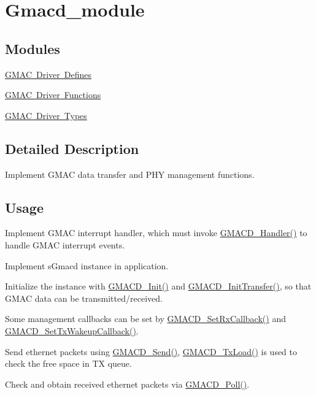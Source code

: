 \hypertarget{group__gmacd__module}{}\section{Gmacd\+\_\+module}
\label{group__gmacd__module}
\subsection*{Modules}
\begin{DoxyCompactItemize}
\item 
\mbox{\hyperlink{group__gmacd__defines}{G\+M\+A\+C Driver Defines}}
\item 
\mbox{\hyperlink{group__gmacd__functions}{G\+M\+A\+C Driver Functions}}
\item 
\mbox{\hyperlink{group__gmacd__types}{G\+M\+A\+C Driver Types}}
\end{DoxyCompactItemize}


\subsection{Detailed Description}
Implement G\+M\+AC data transfer and P\+HY management functions.\hypertarget{group__RTEMSBSPsARM_Usage}{}\subsection{Usage}\label{group__RTEMSBSPsARM_Usage}

\begin{DoxyEnumerate}
\item Implement G\+M\+AC interrupt handler, which must invoke \mbox{\hyperlink{group__gmacd__functions_ga782194c9b7163c22016beabc6101856c}{G\+M\+A\+C\+D\+\_\+\+Handler()}} to handle G\+M\+AC interrupt events.
\item Implement s\+Gmacd instance in application.
\item Initialize the instance with \mbox{\hyperlink{group__gmacd__functions_ga8706caf686e1d073851111db1ba2663c}{G\+M\+A\+C\+D\+\_\+\+Init()}} and \mbox{\hyperlink{group__gmacd__functions_ga418589cbbef19de6084670d572b6ae27}{G\+M\+A\+C\+D\+\_\+\+Init\+Transfer()}}, so that G\+M\+AC data can be transmitted/received.
\item Some management callbacks can be set by \mbox{\hyperlink{group__gmacd__functions_ga3ea0884def476f9698f1cdbae6b6f3e2}{G\+M\+A\+C\+D\+\_\+\+Set\+Rx\+Callback()}} and \mbox{\hyperlink{group__gmacd__functions_ga0806a8a23ffb3180d3404ec6d7fbfa1d}{G\+M\+A\+C\+D\+\_\+\+Set\+Tx\+Wakeup\+Callback()}}.
\item Send ethernet packets using \mbox{\hyperlink{group__gmacd__functions_ga2f3e029556b9627258a2eb1dc4919d95}{G\+M\+A\+C\+D\+\_\+\+Send()}}, \mbox{\hyperlink{group__gmacd__functions_ga1bd3fe40e63537dce59dd4368dce4253}{G\+M\+A\+C\+D\+\_\+\+Tx\+Load()}} is used to check the free space in TX queue.
\item Check and obtain received ethernet packets via \mbox{\hyperlink{group__gmacd__functions_gaa45b1118c5a1147bde4e3026194bc965}{G\+M\+A\+C\+D\+\_\+\+Poll()}}.
\end{DoxyEnumerate}

